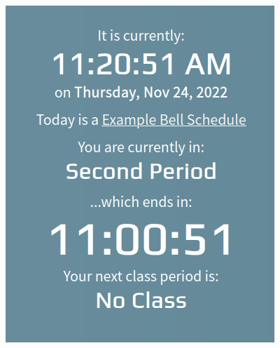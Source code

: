 \documentclass{article}
\begin{document}
\begin{enumerate}
\begin{figure}
\includegraphics[width=3.9992in,height=4.9992in]{Mini20Manual-img002.png}\end{figure}
\end{enumerate}
\end{document}

